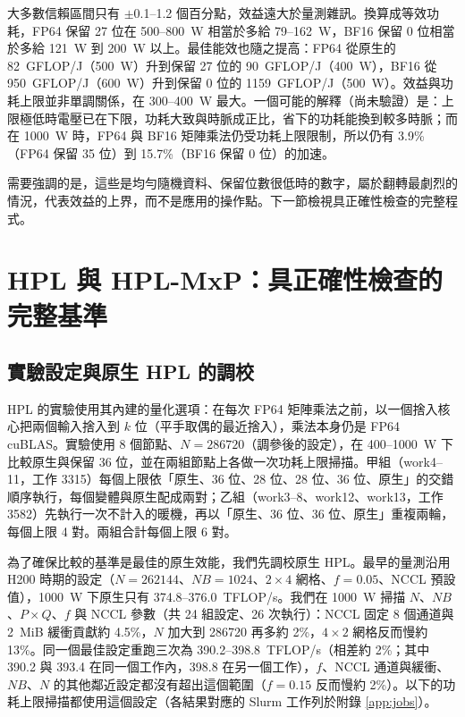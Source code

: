 大多數信賴區間只有 $\pm$0.1–1.2 個百分點，效益遠大於量測雜訊。換算成等效功耗，FP64 保留 27 位在 500–800~W 相當於多給 79–162~W，BF16 保留 0 位相當於多給 121~W 到 200~W 以上。最佳能效也隨之提高：FP64 從原生的 82~GFLOP/J（500~W）升到保留 27 位的 90~GFLOP/J（400~W），BF16 從 950~GFLOP/J（600~W）升到保留 0 位的 1159~GFLOP/J（500~W）。效益與功耗上限並非單調關係，在 300–400~W 最大。一個可能的解釋（尚未驗證）是：上限極低時電壓已在下限，功耗大致與時脈成正比，省下的功耗能換到較多時脈；而在 1000~W 時，FP64 與 BF16 矩陣乘法仍受功耗上限限制，所以仍有 3.9\%（FP64 保留 35 位）到 15.7\%（BF16 保留 0 位）的加速。

需要強調的是，這些是均勻隨機資料、保留位數很低時的數字，屬於翻轉最劇烈的情況，代表效益的上界，而不是應用的操作點。下一節檢視具正確性檢查的完整程式。

\section{HPL 與 HPL-MxP：具正確性檢查的完整基準}\label{sec:hpl}

\subsection{實驗設定與原生 HPL 的調校}\label{sec:hpl-tune}

HPL 的實驗使用其內建的量化選項：在每次 FP64 矩陣乘法之前，以一個捨入核心把兩個輸入捨入到 $k$ 位（平手取偶的最近捨入），乘法本身仍是 FP64 cuBLAS。實驗使用 8 個節點、$N = 286720$（調參後的設定），在 400–1000~W 下比較原生與保留 36 位，並在兩組節點上各做一次功耗上限掃描。甲組（work4–11，工作 3315）每個上限依「原生、36 位、28 位、28 位、36 位、原生」的交錯順序執行，每個變體與原生配成兩對；乙組（work3–8、work12、work13，工作 3582）先執行一次不計入的暖機，再以「原生、36 位、36 位、原生」重複兩輪，每個上限 4 對。兩組合計每個上限 6 對。

為了確保比較的基準是最佳的原生效能，我們先調校原生 HPL。最早的量測沿用 H200 時期的設定（$N = 262144$、$\mathit{NB} = 1024$、$2\times4$ 網格、$f = 0.05$、NCCL 預設值），1000~W 下原生只有 374.8–376.0~TFLOP/s。我們在 1000~W 掃描 $N$、$\mathit{NB}$、$P\times Q$、$f$ 與 NCCL 參數（共 24 組設定、26 次執行）：NCCL 固定 8 個通道與 2~MiB 緩衝貢獻約 4.5\%，$N$ 加大到 286720 再多約 2\%，$4\times2$ 網格反而慢約 13\%。同一個最佳設定重跑三次為 390.2–398.8~TFLOP/s（相差約 2\%；其中 390.2 與 393.4 在同一個工作內，398.8 在另一個工作），$f$、NCCL 通道與緩衝、$\mathit{NB}$、$N$ 的其他鄰近設定都沒有超出這個範圍（$f = 0.15$ 反而慢約 2\%）。以下的功耗上限掃描都使用這個設定（各結果對應的 Slurm 工作列於附錄 \ref{app:jobs}）。

